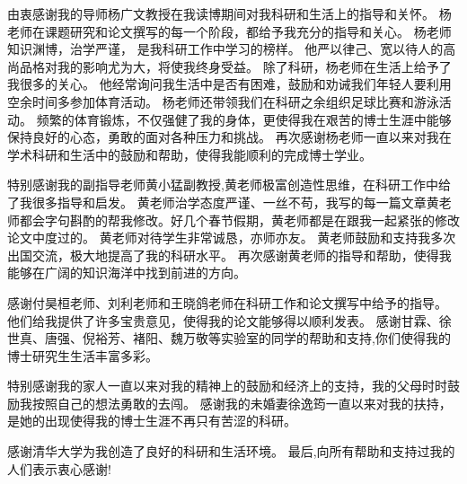 \begin{acknowledgement}
  由衷感谢我的导师杨广文教授在我读博期间对我科研和生活上的指导和关怀。
  杨老师在课题研究和论文撰写的每一个阶段，都给予我充分的指导和关心。
  杨老师知识渊博，治学严谨， 是我科研工作中学习的榜样。
  他严以律己、宽以待人的高尚品格对我的影响尤为大，将使我终身受益。
  除了科研，杨老师在生活上给予了我很多的关心。
  他经常询问我生活中是否有困难，鼓励和劝诫我们年轻人要利用空余时间多参加体育活动。
  杨老师还带领我们在科研之余组织足球比赛和游泳活动。
  频繁的体育锻炼，不仅强健了我的身体，更使得我在艰苦的博士生涯中能够保持良好的心态，勇敢的面对各种压力和挑战。 
  再次感谢杨老师一直以来对我在学术科研和生活中的鼓励和帮助，使得我能顺利的完成博士学业。

  特别感谢我的副指导老师黄小猛副教授,黄老师极富创造性思维，在科研工作中给了我很多指导和启发。 
  黄老师治学态度严谨、一丝不苟，我写的每一篇文章黄老师都会字句斟酌的帮我修改。好几个春节假期，黄老师都是在跟我一起紧张的修改论文中度过的。
  黄老师对待学生非常诚恳，亦师亦友。 
  黄老师鼓励和支持我多次出国交流，极大地提高了我的科研水平。
  再次感谢黄老师的指导和帮助，使得我能够在广阔的知识海洋中找到前进的方向。


  感谢付昊桓老师、刘利老师和王晓鸽老师在科研工作和论文撰写中给予的指导。 他们给我提供了许多宝贵意见，使得我的论文能够得以顺利发表。
  感谢甘霖、徐世真、唐强、倪裕芳、褚阳、魏万敬等实验室的同学的帮助和支持,你们使得我的博士研究生生活丰富多彩。 

  特别感谢我的家人一直以来对我的精神上的鼓励和经济上的支持，我的父母时时鼓励我按照自己的想法勇敢的去闯。
  感谢我的未婚妻徐逸筠一直以来对我的扶持，是她的出现使得我的博士生涯不再只有苦涩的科研。
  
  感谢清华大学为我创造了良好的科研和生活环境。
  最后,向所有帮助和支持过我的人们表示衷心感谢!

\end{acknowledgement}

